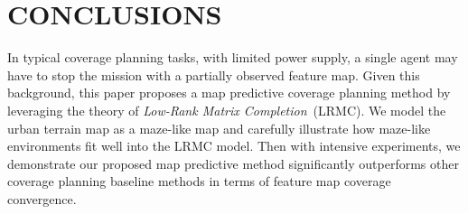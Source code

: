 \section{CONCLUSIONS}
In typical coverage planning tasks, with limited power supply, a single agent may have to stop the mission with a partially observed feature map. Given this background, this paper proposes a map predictive coverage planning method by leveraging the theory of \textit{Low-Rank Matrix Completion}~(LRMC). We model the urban terrain map as a maze-like map and carefully illustrate how maze-like environments fit well into the LRMC model. Then with intensive experiments, we demonstrate our proposed map predictive method significantly outperforms other coverage planning baseline methods in terms of feature map coverage convergence.